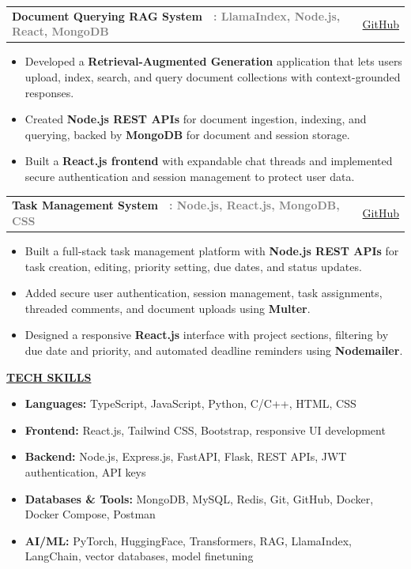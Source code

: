 \documentclass[a4paper,11pt]{article}
\makeatletter
\newcommand{\TitleText}[1]{\textbf{\large #1}}
\newcommand{\BlackBold}[1]{\textbf{#1}}
\newcommand{\GrayText}[1]{\textcolor{graytext}{\textbf{#1}}}
\newcommand{\SectionHeader}[1]{%
  \vspace{2mm}%
  \begin{center}
    {\large\textbf{\underline{#1}}}%
  \end{center}
  \vspace{-2mm}%
}
\newcommand{\ProjectLine}[4]{%
  \begin{tabularx}{\textwidth}{@{} X r @{}}
    {\TitleText{#1}\ \ \GrayText{: #2}} & {\small \href{#4}{\textcolor{linkblue}{#3}}} \\
  \end{tabularx}
}
\makeatother
\begin{document}
\vspace{3mm}

\ProjectLine{Document Querying RAG System}{LlamaIndex, Node.js, React, MongoDB}{GitHub}{https://github.com/Makireddyvighnesh/RAG-LLM-Query-Engine}
{\normalsize
\begin{itemize}
  \item Developed a \BlackBold{Retrieval-Augmented Generation} application that lets users upload, index, search, and query document collections with context-grounded responses.
  \item Created \BlackBold{Node.js REST APIs} for document ingestion, indexing, and querying, backed by \BlackBold{MongoDB} for document and session storage.
  \item Built a \BlackBold{React.js frontend} with expandable chat threads and implemented secure authentication and session management to protect user data.
\end{itemize}
}

\vspace{3mm}

\ProjectLine{Task Management System}{Node.js, React.js, MongoDB, CSS}{GitHub}{https://github.com/Makireddyvighnesh/Task_management_system}
{\normalsize
\begin{itemize}
  \item Built a full-stack task management platform with \BlackBold{Node.js REST APIs} for task creation, editing, priority setting, due dates, and status updates.
  \item Added secure user authentication, session management, task assignments, threaded comments, and document uploads using \BlackBold{Multer}.
  \item Designed a responsive \BlackBold{React.js} interface with project sections, filtering by due date and priority, and automated deadline reminders using \BlackBold{Nodemailer}.
\end{itemize}
}

\SectionHeader{TECH SKILLS}
{\normalsize
\begin{itemize}
  \item \BlackBold{Languages:} TypeScript, JavaScript, Python, C/C++, HTML, CSS
  \item \BlackBold{Frontend:} React.js, Tailwind CSS, Bootstrap, responsive UI development
  \item \BlackBold{Backend:} Node.js, Express.js, FastAPI, Flask, REST APIs, JWT authentication, API keys
  \item \BlackBold{Databases \& Tools:} MongoDB, MySQL, Redis, Git, GitHub, Docker, Docker Compose, Postman
  \item \BlackBold{AI/ML:} PyTorch, HuggingFace, Transformers, RAG, LlamaIndex, LangChain, vector databases, model finetuning
\end{itemize}
}
\end{document}
